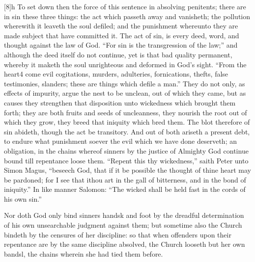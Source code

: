 [8]h To set down then the force of this sentence in absolving penitents; there are in sin these three things: the act which passeth away and vanisheth; the pollution wherewith it leaveth the soul defiled; and the punishment whereunto they are made subject that have committed it. The act of sin, is every deed, word, and thought against the law of God. “For sin is the transgression of the law;” and although the deed itself do not continue, yet is that bad quality permanent, whereby it maketh the soul unrighteous and deformed in God’s sight. “From the heart4 come evil cogitations, murders, adulteries, fornications, thefts, false testimonies, slanders; these are things which defile a man.” They do not only, as effects of impurity, argue the nest to be unclean, out of which they came, but as causes they strengthen that disposition unto wickedness which brought them forth; they are both fruits and seeds of uncleanness, they nourish the root out of which they grow, they breed that iniquity which bred them. The blot therefore of sin abideth, though the act be transitory. And out of both ariseth a present debt, to endure what punishment soever the evil which we have done deserveth;  an obligation, in the chains whereof sinners by the justice of Almighty God continue bound till repentance loose them. “Repent this thy wickedness,” saith Peter unto Simon Magus, “beseech God, that if it be possible the thought of thine heart may be pardoned; for I see that ithou art in the gall of bitterness, and in the bond of iniquity.” In like manner Salomon: “The wicked shall be held fast in the cords of his own sin.”

Nor doth God only bind sinners handsk and foot by the dreadful determination of his own unsearchable judgment against them; but sometime also the Church bindeth by the censures of her discipline: so that when offenders upon their repentance are by the same discipline absolved, the Church looseth but her own bandsl, the chains wherein she had tied them before.

